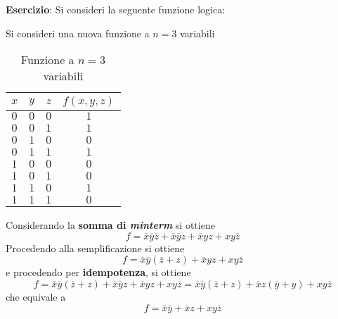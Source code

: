 \documentclass[a4paper]{extarticle}
\begin{document}
\vspace{1em}
\noindent
\textbf{Esercizio}: Si consideri la seguente funzione logica:

\vspace{1em}
\noindent
Si consideri una nuova funzione a \(n = 3\) variabili
\begin{table}[H]
    \centering
    \begin{tabular}{ccc|c}
         $x$ & $y$ & $z$ & $f(x, y, z)$\\
         \hline
         $0$ & $0$ & $0$ & $1$\\
         $0$ & $0$ & $1$ & $1$\\
         $0$ & $1$ & $0$ & $0$\\
         $0$ & $1$ & $1$ & $1$\\
         $1$ & $0$ & $0$ & $0$\\
         $1$ & $0$ & $1$ & $0$\\
         $1$ & $1$ & $0$ & $1$\\
         $1$ & $1$ & $1$ & $0$\\
    \end{tabular}
    \caption{Funzione a \(n = 3\) variabili}
    \label{tab:funzione_3_variabili_3}
\end{table}

\noindent
Considerando la \textbf{somma di \textit{minterm}} si ottiene
\[f = \overline{x}\overline{y}\overline{z} + \overline{x}\overline{y}z + \overline{x}yz + xy\overline{z}\]
Procedendo alla semplificazione si ottiene
\[f = \overline{x}\overline{y}(\overline{z} + z) + \overline{x}yz + xy\overline{z}\]
e procedendo per \textbf{idempotenza}, si ottiene
\[f = \overline{x}\overline{y}(\overline{z} + z) + \overline{x}\overline{y}z + \overline{x}yz + xy\overline{z} = \overline{x}\overline{y}(\overline{z} + z) + \overline{x}z (\overline{y} + y) + xy\overline{z}\]
che equivale a
\[f = \overline{x}\overline{y} + \overline{x}z + xy\overline{z}\]
\end{document}
